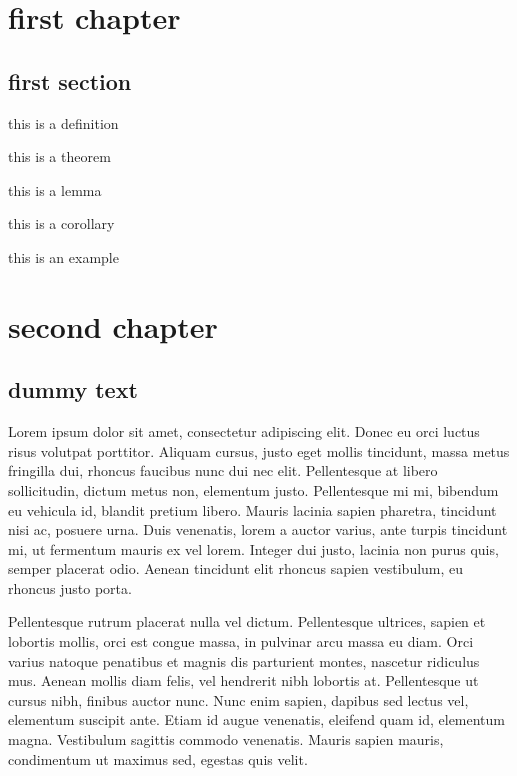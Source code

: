 \chapter{first chapter} 

\section{first section}

\begin{defn}
    this is a definition
\end{defn}

\begin{thm}
    this is a theorem
\end{thm}

\begin{lem}
    this is a lemma
\end{lem}

\begin{cor}
    this is a corollary
\end{cor}

\begin{eg}
    this is an example
\end{eg}

\chapter{second chapter}

\section{dummy text}

Lorem ipsum dolor sit amet, consectetur adipiscing elit. Donec eu orci luctus risus volutpat porttitor. Aliquam cursus, justo eget mollis tincidunt, massa metus fringilla dui, rhoncus faucibus nunc dui nec elit. Pellentesque at libero sollicitudin, dictum metus non, elementum justo. Pellentesque mi mi, bibendum eu vehicula id, blandit pretium libero. Mauris lacinia sapien pharetra, tincidunt nisi ac, posuere urna. Duis venenatis, lorem a auctor varius, ante turpis tincidunt mi, ut fermentum mauris ex vel lorem. Integer dui justo, lacinia non purus quis, semper placerat odio. Aenean tincidunt elit rhoncus sapien vestibulum, eu rhoncus justo porta.

Pellentesque rutrum placerat nulla vel dictum. Pellentesque ultrices, sapien et lobortis mollis, orci est congue massa, in pulvinar arcu massa eu diam. Orci varius natoque penatibus et magnis dis parturient montes, nascetur ridiculus mus. Aenean mollis diam felis, vel hendrerit nibh lobortis at. Pellentesque ut cursus nibh, finibus auctor nunc. Nunc enim sapien, dapibus sed lectus vel, elementum suscipit ante. Etiam id augue venenatis, eleifend quam id, elementum magna. Vestibulum sagittis commodo venenatis. Mauris sapien mauris, condimentum ut maximus sed, egestas quis velit.


